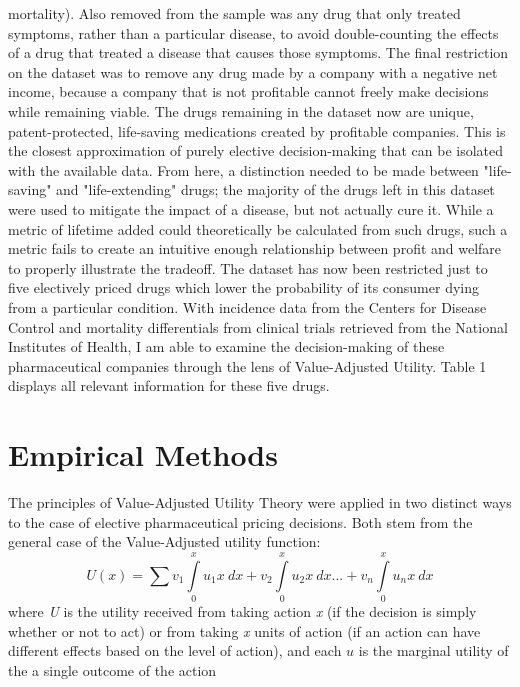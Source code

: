 \documentclass[12pt,english]{article} \usepackage{mathptmx}
\begin{document}
mortality)\cite{cod18}. Also removed from the sample was any drug that 
only treated symptoms, rather than a particular disease, to avoid 
double-counting the effects of a drug that treated a disease that causes 
those symptoms. The final restriction on the dataset was to remove any 
drug made by a company with a negative net income, because a company 
that is not profitable cannot freely make decisions while remaining 
viable. The drugs remaining in the dataset now are unique, 
patent-protected, life-saving medications created by profitable 
companies. This is the closest approximation of purely elective 
decision-making that can be isolated with the available data. From here, 
a distinction needed to be made between "life-saving" and 
"life-extending" drugs; the majority of the drugs left in this dataset 
were used to mitigate the impact of a disease, but not actually cure it. 
While a metric of lifetime added could theoretically be calculated from 
such drugs, such a metric fails to create an intuitive enough 
relationship between profit and welfare to properly illustrate the 
tradeoff. The dataset has now been restricted just to five electively 
priced drugs which lower the probability of its consumer dying from a 
particular condition. With incidence data from the Centers for Disease 
Control and mortality differentials from clinical trials retrieved from 
the National Institutes of Health, I am able to examine the 
decision-making of these pharmaceutical companies through the lens of 
Value-Adjusted Utility\cite{cdc20}\cite{trials}. Table 1 displays all 
relevant information for these five drugs. \section{Empirical 
Methods}\label{sec:methods} The principles of Value-Adjusted Utility 
Theory were applied in two distinct ways to the case of elective 
pharmaceutical pricing decisions. Both stem from the general case of the 
Value-Adjusted utility function\cite{mozaffar20}: \begin{equation} U(x) 
= \sum {v_1\int\limits_0^x u_1x \ dx + v_2\int\limits_0^x u_2x \ dx ... 
+ v_n\int\limits_0^x u_nx \ dx }\end{equation} where \emph{U} is the 
utility received from taking action \emph{x} (if the decision is simply 
whether or not to act) or from taking \emph{x} units of action (if an 
action can have different effects based on the level of action), and 
each $u$ is the marginal utility of the a single outcome of the action 
\end{document}
